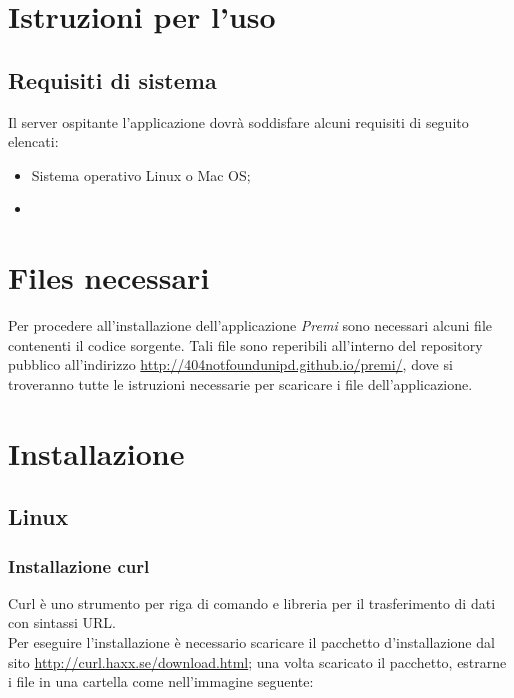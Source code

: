 \section{Istruzioni per l'uso}
\subsection{Requisiti di sistema}
Il server ospitante l'applicazione dovrà soddisfare alcuni requisiti di seguito elencati:
\begin{itemize}
\item Sistema operativo Linux o Mac OS;
\item 
\end{itemize}

\section{Files necessari}
Per procedere all'installazione dell'applicazione \emph{Premi} sono necessari alcuni file contenenti il codice sorgente.
Tali file sono reperibili all'interno del repository pubblico all'indirizzo \href{http://404notfoundunipd.github.io/premi/}{http://404notfoundunipd.github.io/premi/}, dove si troveranno tutte le istruzioni necessarie per scaricare i file dell'applicazione.

\section{Installazione}
\subsection{Linux}

\subsubsection{Installazione curl}
Curl è uno strumento per riga di comando e libreria per il trasferimento di dati con sintassi URL. \\
Per eseguire l'installazione è necessario scaricare il pacchetto d'installazione dal sito \href{http://curl.haxx.se/download.html}{http://curl.haxx.se/download.html}; una volta scaricato il pacchetto, estrarne i file in una cartella come nell'immagine seguente:

